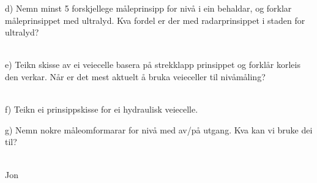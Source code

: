d) Nemn minst 5 forskjellege måleprinsipp for nivå i ein behaldar, og forklar måleprinsippet med ultralyd. Kva fordel er der med radarprinsippet i staden for ultralyd? 
\\
\\
e) Teikn skisse av ei veiecelle basera på strekklapp prinsippet og forklår korleis den verkar. Når er det mest aktuelt å bruka veieceller til nivåmåling?
\\
\\
f) Teikn ei prinsippskisse for ei hydraulisk veiecelle. 
\\
\eject 
g) Nemn nokre måleomformarar for nivå med av/på utgang. Kva kan vi bruke dei til?
\\
\\
\vfil
\pagebreak
Jon
\pagebreak

                         

	










